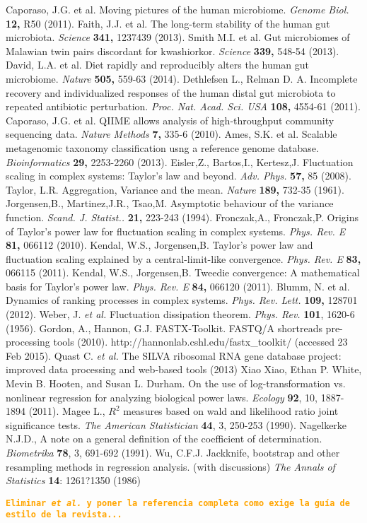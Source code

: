 \documentclass[12pt,oneside,letterpaper]{article}
\newcommand{\todo}[1]{\texttt{\bfseries\textcolor{Orange}{#1}}}
\begin{document}
\begin{thebibliography}{99}
 Caporaso, J.G. et al. Moving pictures of the human microbiome. {\it Genome Biol.} {\bf 12,} R50 (2011).
 Faith, J.J. et al. The long-term stability of the human gut microbiota. {\it Science} {\bf 341,} 1237439 (2013).
 Smith M.I. et al. Gut microbiomes of Malawian twin pairs discordant for kwashiorkor. {\it Science} {\bf 339,} 548-54 (2013).
 David, L.A. et al. Diet rapidly and reproducibly alters the human gut microbiome. {\it Nature} {\bf 505,} 559-63 (2014).
 Dethlefsen L., Relman D. A. Incomplete recovery and individualized responses of the human distal gut microbiota to repeated antibiotic perturbation. {\it Proc. Nat. Acad. Sci. USA} {\bf 108,} 4554-61 (2011).
 Caporaso, J.G. et al. QIIME allows analysis of high-throughput community sequencing data. {\it Nature Methods} {\bf 7,} 335-6 (2010).
 Ames, S.K. et al. Scalable metagenomic taxonomy classification usng a reference genome database. {\it Bioinformatics} {\bf 29,} 2253-2260 (2013).
 Eisler,Z., Bartos,I., Kertesz,J. Fluctuation scaling in complex systems: Taylor's law and beyond. {\it Adv. Phys.} {\bf 57,} 85 (2008).
 Taylor, L.R. Aggregation, Variance and the mean. {\it Nature} {\bf 189,} 732-35 (1961).
 Jorgensen,B., Martinez,J.R., Tsao,M. Asymptotic behaviour of the variance function. {\it Scand. J. Statist..} {\bf 21,} 223-243 (1994).
 Fronczak,A., Fronczak,P. Origins of Taylor's power law for fluctuation scaling in complex systems. {\it Phys. Rev. E} {\bf 81,} 066112 (2010).
 Kendal, W.S., Jorgensen,B. Taylor's power law and fluctuation scaling explained by a central-limit-like convergence. {\it Phys. Rev. E} {\bf 83,} 066115 (2011).
 Kendal, W.S., Jorgensen,B. Tweedie convergence: A mathematical basis for Taylor's power law. {\it Phys. Rev. E} {\bf 84,} 066120 (2011).
 Blumm, N. et al. Dynamics of ranking processes in complex systems. {\it Phys. Rev. Lett.} {\bf 109,} 128701 (2012).
	 Weber, J. \textit{et al.} Fluctuation dissipation theorem. {\it Phys. Rev.} {\bf 101}, 1620-6 (1956).
	 Gordon, A., Hannon, G.J. FASTX-Toolkit. FASTQ/A shortreads pre-processing tools (2010). http://hannonlab.cshl.edu/fastx\_toolkit/ (accessed 23 Feb 2015).
	 Quast C.  \textit{et al.} The SILVA ribosomal RNA gene database project: improved data processing and web-based tools (2013)
 	 Xiao Xiao, Ethan P. White, Mevin B. Hooten, and Susan L. Durham. On the use of log-transformation vs. nonlinear regression for analyzing biological power laws. {\it Ecology} {\bf 92}, 10, 1887-1894 (2011).
 	 Magee L., $R^2$ measures based on wald and likelihood ratio joint significance tests. {\it The American Statistician} {\bf 44}, 3, 250-253 (1990).
	 Nagelkerke N.J.D., A note on a general definition of the coefficient of determination. {\it Biometrika} {\bf 78}, 3, 691-692 (1991).
	 Wu, C.F.J. Jackknife, bootstrap and other resampling methods in regression analysis. (with discussions) \textit{The Annals of Statistics} {\bf 14}: 1261?1350 (1986)
\end{thebibliography}
\todo{Eliminar \textit{et al.} y poner la referencia completa como exige la guía de estilo de la revista...}
\end{document}
